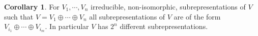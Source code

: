 \documentclass[]{article}
\theoremstyle{definition}
\newtheorem{corollary}{Corollary}[theorem]
\theoremstyle{definition}
\begin{document}
\begin{corollary}
  For \(V_1, \cdots, V_n\) irreducible, non-isomorphic, subrepresentations of 
  \(V\) such that \(V = V_1 \oplus \cdots \oplus V_n\) all subrepresentations 
  of \(V\) are of the form \(V_{i_1} \oplus \cdots \oplus V_{i_m}\). In particular 
  \(V\) has \(2^n\) different subrepresentations.
\end{corollary}
\end{document}
